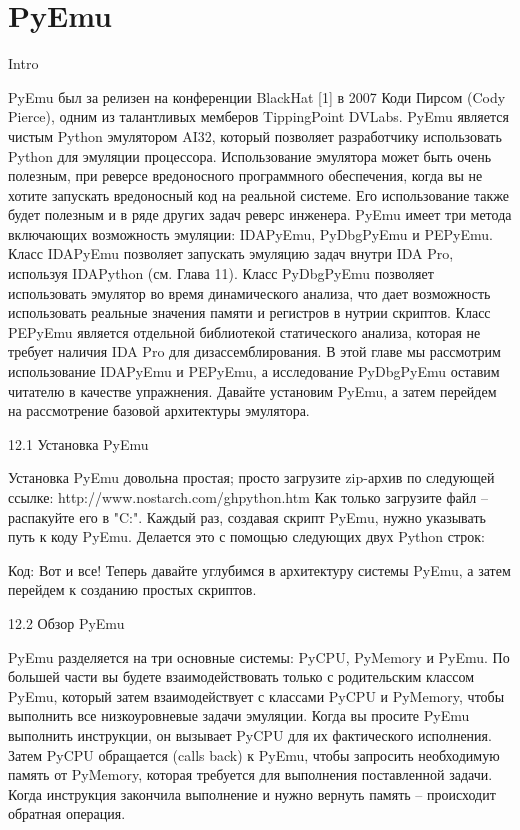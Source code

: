 \documentclass[12pt, a4paper, oneside]{book}
\begin{document}
\chapter{PyEmu}
Intro

PyEmu был за релизен на конференции BlackHat [1] в 2007 Коди Пирсом (Cody Pierce), одним из талантливых мемберов TippingPoint DVLabs. PyEmu является чистым Python эмулятором AI32, который позволяет разработчику использовать Python для эмуляции процессора. Использование эмулятора может быть очень полезным, при реверсе вредоносного программного обеспечения, когда вы не хотите запускать вредоносный код на реальной системе. Его использование также будет полезным и в ряде других задач реверс инженера. PyEmu имеет три метода включающих возможность эмуляции: IDAPyEmu, PyDbgPyEmu и PEPyEmu. Класс IDAPyEmu позволяет запускать эмуляцию задач внутри IDA Pro, используя IDAPython (см. Глава 11). Класс PyDbgPyEmu позволяет использовать эмулятор во время динамического анализа, что дает возможность использовать реальные значения памяти и регистров в нутрии скриптов. Класс PEPyEmu является отдельной библиотекой статического анализа, которая не требует наличия IDA Pro для дизассемблирования. В этой главе мы рассмотрим использование IDAPyEmu и PEPyEmu, а исследование PyDbgPyEmu оставим читателю в качестве упражнения. Давайте установим PyEmu, а затем перейдем на рассмотрение базовой архитектуры эмулятора.


12.1 Установка PyEmu

Установка PyEmu довольна простая; просто загрузите zip-архив по следующей ссылке:
http://www.nostarch.com/ghpython.htm
Как только загрузите файл – распакуйте его в "C:\PyEmu". Каждый раз, создавая скрипт PyEmu, нужно указывать путь к коду PyEmu. Делается это с помощью следующих двух Python строк:

Код:
Вот и все! Теперь давайте углубимся в архитектуру системы PyEmu, а затем перейдем к созданию простых скриптов.


12.2 Обзор PyEmu

PyEmu разделяется на три основные системы: PyCPU, PyMemory и PyEmu. По большей части вы будете взаимодействовать только с родительским классом PyEmu, который затем взаимодействует с классами PyCPU и PyMemory, чтобы выполнить все низкоуровневые задачи эмуляции. Когда вы просите PyEmu выполнить инструкции, он вызывает PyCPU для их фактического исполнения. Затем PyCPU обращается (calls back) к PyEmu, чтобы запросить необходимую память от PyMemory, которая требуется для выполнения поставленной задачи. Когда инструкция закончила выполнение и нужно вернуть память – происходит обратная операция.
\end{document}
